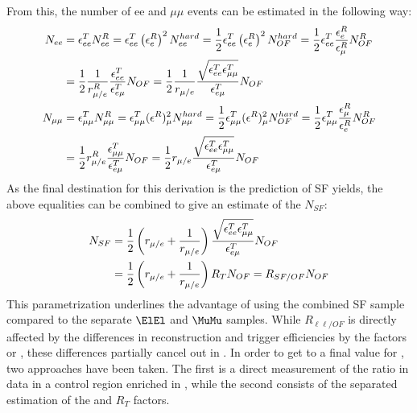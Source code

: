 From this, the number of ee and $\mu\mu$ events can be estimated in the following way:
\begin{align}
\label{eq:eemumuFormula}
N_{ee} & = \epsilon^{T}_{ee} N^{R}_{ee} = \epsilon^{T}_{ee} \left(\epsilon^{R}_{e}\right)^{2} N^{hard}_{ee} = \frac{1}{2} \epsilon^{T}_{ee} \left(\epsilon^{R}_{e}\right)^{2} N^{hard}_{OF} 
										= \frac{1}{2} \epsilon^{T}_{ee} \frac{\epsilon^{R}_{e}}{\epsilon^{R}_{\mu}} N^{R}_{OF} \notag \\
       & =\frac{1}{2} \frac{1}{r^{R}_{\mu/e}} \frac{\epsilon^{T}_{ee}}{\epsilon^{T}_{e\mu}}N_{OF} 
										= \frac{1}{2} \frac{1}{r_{\mu/e}} \frac{\sqrt{\epsilon^{T}_{ee}\epsilon^{T}_{\mu\mu}}}{\epsilon^{T}_{e\mu}} N_{OF}  \notag \\
N_{\mu\mu} & = \epsilon^{T}_{\mu\mu} N^{R}_{\mu\mu} = \epsilon^{T}_{\mu\mu} (\epsilon^{R})^{2}_{\mu} N^{hard}_{\mu\mu} = \frac{1}{2} \epsilon^{T}_{\mu\mu} (\epsilon^{R})^{2}_{\mu} N^{hard}_{OF}
										= \frac{1}{2} \epsilon^{T}_{\mu\mu} \frac{\epsilon^{R}_{\mu}}{\epsilon^{R}_{e}} N^{R}_{OF}  \notag \\
	  & =\frac{1}{2} r^{R}_{\mu/e} \frac{\epsilon^{T}_{\mu\mu}}{\epsilon^{T}_{e\mu}}N_{OF} = \frac{1}{2} r_{\mu/e} \frac{\sqrt{\epsilon^{T}_{ee}\epsilon^{T}_{\mu\mu}}}{\epsilon^{T}_{e\mu}} N_{OF}
\end{align}
As the final destination for this derivation is the prediction of SF yields, the above equalities can be combined to give an estimate of the $N_{SF}$:
\begin{align}
\label{eq:masterformulaExp}
    N_{SF} & = \frac{1}{2} \left( r_{\mu/e} + \frac{1}{r_{\mu/e}} \right) \frac{\sqrt{\epsilon^{T}_{ee}\epsilon^{T}_{\mu\mu}}}{\epsilon^{T}_{e\mu}} N_{OF}  \notag \\
           & = \frac{1}{2} \left( r_{\mu/e} + \frac{1}{r_{\mu/e}} \right) R_{T} N_{OF} = R_{SF/OF} N_{OF}
\end{align}                                                                                                                                                                  
This parametrization underlines the advantage of using the combined SF sample compared to the separate $\ElEl$ and $\MuMu$ samples.
While $R_{\ell\ell/OF}$ is directly affected by the differences in reconstruction and trigger efficiencies by the factors \rmue or \rmueinv, these differences partially cancel out in \Rsfof. 
In order to get to a final value for \Rsfof, two approaches have been taken. 
The first is a direct measurement of the ratio \Rsfof in data in a control region enriched in \ttbar, while the second consists of the separated estimation of the \rmue and $R_T$ factors.

